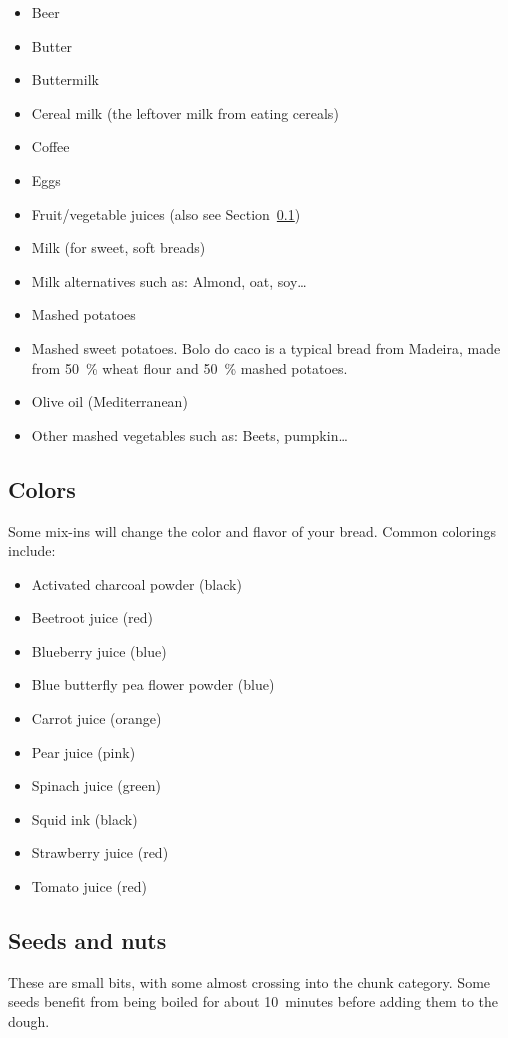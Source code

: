 \begin{itemize}
  \item Beer
  \item Butter
  \item Buttermilk
  \item Cereal milk (the leftover milk from eating cereals)
  \item Coffee
  \item Eggs
  \item Fruit/vegetable juices (also see Section~\ref{sec:colors})
  \item Milk (for sweet, soft breads)
  \item Milk alternatives such as: Almond, oat, soy\dots{}
  \item Mashed potatoes
  \item Mashed sweet potatoes. Bolo do caco is a typical bread from Madeira,
    made from \qty{50}{\percent} wheat flour and \qty{50}{\percent} mashed potatoes.
  \item Olive oil (Mediterranean)
  \item Other mashed vegetables such as: Beets, pumpkin\dots{}
\end{itemize}

\subsection{Colors}%
\label{sec:colors}
Some mix-ins will change the color and flavor of your bread. Common colorings
include:

\begin{itemize}
  \item Activated charcoal powder (black)
  \item Beetroot juice (red)
  \item Blueberry juice (blue)
  \item Blue butterfly pea flower powder (blue)
  \item Carrot juice (orange)
  \item Pear juice (pink)
  \item Spinach juice (green)
  \item Squid ink (black)
  \item Strawberry juice (red)
  \item Tomato juice (red)
\end{itemize}

\subsection{Seeds and nuts}
These are small bits, with some almost crossing into the chunk category. Some
seeds benefit from being boiled for about 10~minutes before adding them to the
dough.

